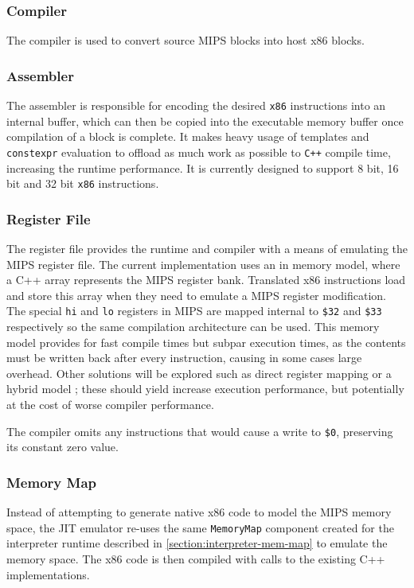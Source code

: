 \subsubsection{Compiler}

The compiler is used to convert source MIPS blocks into host x86 blocks.

\subsubsection{Assembler}

The assembler is responsible for encoding the desired \texttt{x86} instructions into an internal buffer, which can then be copied into the executable memory buffer once compilation of a block is complete. It makes heavy usage of templates and \texttt{constexpr} evaluation to offload as much work as possible to \texttt{C++} compile time, increasing the runtime performance. It is currently designed to support 8 bit, 16 bit and 32 bit \texttt{x86} instructions.

\subsubsection{Register File}

The register file provides the runtime and compiler with a means of emulating the MIPS register file. The current implementation uses an in memory model, where a C++ array represents the MIPS register bank. Translated x86 instructions load and store this array when they need to emulate a MIPS register modification. The special \texttt{hi} and \texttt{lo} registers in MIPS are mapped internal to \texttt{\$32} and \texttt{\$33} respectively so the same compilation architecture can be used. This memory model provides for fast compile times but subpar execution times, as the contents must be written back after every instruction, causing in some cases large overhead. Other solutions will be explored such as direct register mapping or a hybrid model \cite{mark-probst-dbt}; these should yield increase execution performance, but potentially at the cost of worse compiler performance.

The compiler omits any instructions that would cause a write to \texttt{\$0}, preserving its constant zero value.

\subsubsection{Memory Map}

Instead of attempting to generate native x86 code to model the MIPS memory space, the JIT emulator re-uses the same \texttt{MemoryMap} component created for the interpreter runtime described in \autoref{section:interpreter-mem-map} to emulate the memory space. The x86 code is then compiled with calls to the existing C++ implementations.
